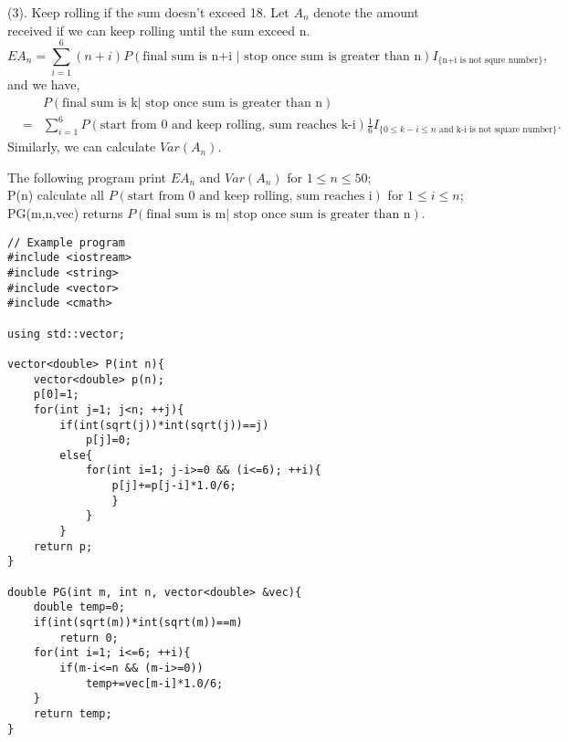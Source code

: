 \documentclass[10pt, onecolumn, draftcls]{IEEEtran}
\begin{document}
\begin{enumerate}
(3). Keep rolling if the sum doesn't exceed 18. Let $A_n$ denote the amount received if we can keep rolling until the sum exceed n. 
$$EA_n=\sum_{i=1}^6(n+i)P(\text{final sum is n+i }|\text{ stop once sum is greater than n})I_{\{\text{n+i is not squre number}\}},$$
and we have,
\begin{eqnarray}
&&P(\text{final sum is k}|\text{ stop once sum is greater than n})\\
&=&\sum_{i=1}^6P(\text{start from 0 and keep rolling, sum reaches k-i})\frac{1}{6}I_{\{0\le k-i\le n\text{ and k-i is not square number}\}}.
\end{eqnarray}
Similarly, we can calculate $Var(A_n)$.

The following program print $EA_n$ and $Var(A_n)$ for $1\le n\le50$; \\
P(n) calculate all $P(\text{start from 0 and keep rolling, sum reaches i})$ for $1\le i\le n$;\\
PG(m,n,vec) returns $P(\text{final sum is m}|\text{ stop once sum is greater than n})$.
\begin{lstlisting}
// Example program
#include <iostream>
#include <string>
#include <vector>
#include <cmath>

using std::vector;

vector<double> P(int n){
    vector<double> p(n);
    p[0]=1;
    for(int j=1; j<n; ++j){
        if(int(sqrt(j))*int(sqrt(j))==j)
            p[j]=0;
        else{
            for(int i=1; j-i>=0 && (i<=6); ++i){
                p[j]+=p[j-i]*1.0/6;
                }
            }
        }
    return p;
}

double PG(int m, int n, vector<double> &vec){
    double temp=0;
    if(int(sqrt(m))*int(sqrt(m))==m)
        return 0;
    for(int i=1; i<=6; ++i){
        if(m-i<=n && (m-i>=0))
            temp+=vec[m-i]*1.0/6;
    }
    return temp;
}


\end{lstlisting}
\end{enumerate}
\end{document}
